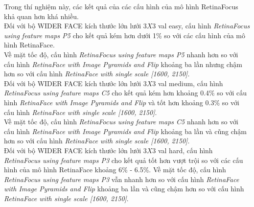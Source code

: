 {    \noindent
    Trong thí nghiệm này, các kết quả của các cấu hình của mô hình RetinaFocus khả quan hơn khá nhiều. \\
    Đối với bộ WIDER FACE kích thước lớn lưới $3 X 3$ val easy, cấu hình \textit{RetinaFocus using feature maps P5} cho kết quả kém hơn dưới 1\% so với các cấu hình của mô hình RetinaFace. \\
    Về mặt tốc độ, cấu hình \textit{RetinaFocus using feature maps P5} nhanh hơn so với cấu hình \textit{RetinaFace with Image Pyramids and Flip} khoảng ba lần nhưng chậm hơn so với cấu hình \textit{RetinaFace with single scale [1600, 2150]}. \\
    Đối với bộ WIDER FACE kích thước lớn lưới $3 X 3$ val medium, cấu hình \textit{RetinaFocus using feature maps C5} cho kết quả kém hơn khoảng 0.4\% so với cấu hình \textit{RetinaFace with Image Pyramids and Flip} và tốt hơn khoảng 0.3\% so với cấu hình \textit{RetinaFace with single scale [1600, 2150]}. \\
    Về mặt tốc độ, cấu hình \textit{RetinaFocus using feature maps C5} nhanh hơn so với cấu hình \textit{RetinaFace with Image Pyramids and Flip} khoảng ba lần và cũng chậm hơn so với cấu hình \textit{RetinaFace with single scale [1600, 2150]}. \\
    Đối với bộ WIDER FACE kích thước lớn lưới $3 X 3$ val hard, cấu hình \textit{RetinaFocus using feature maps P3} cho kết quả tốt hơn vượt trội so với các cấu hình của mô hình RetinaFace khoảng 6\% - 6.5\%.
    Về mặt tốc độ, cấu hình \textit{RetinaFocus using feature maps P3} vẫn nhanh hơn so với cấu hình \textit{RetinaFace with Image Pyramids and Flip} khoảng ba lần và cũng chậm hơn so với cấu hình \textit{RetinaFace with single scale [1600, 2150]}.

}
